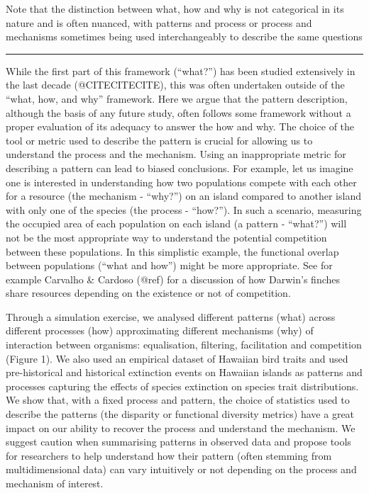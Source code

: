 \documentclass[12pt,letterpaper]{article}
\begin{document}
Note that the distinction between what, how and why is not categorical in its nature and is often nuanced, with patterns and process or process and mechanisms sometimes being used interchangeably to describe the same questions

\hrule

While the first part of this framework (“what?”) has been studied extensively in the last decade (@CITECITECITE), this was often undertaken outside of the “what, how, and why” framework.
Here we argue that the pattern description, although the basis of any future study, often follows some framework without a proper evaluation of its adequacy to answer the how and why.
The choice of the tool or metric used to describe the pattern is crucial for allowing us to understand the process and the mechanism.
Using an inappropriate metric for describing a pattern can lead to biased conclusions.
For example, let us imagine one is interested in understanding how two populations compete with each other for a resource (the mechanism - “why?”) on an island compared to another island with only one of the species (the process - “how?”).
In such a scenario, measuring the occupied area of each population on each island (a pattern - “what?”) will not be the most appropriate way to understand the potential competition between these populations.
In this simplistic example, the functional overlap between populations (“what and how”) might be more appropriate.
See for example Carvalho \& Cardoso (@ref) for a discussion of how Darwin’s finches share resources depending on the existence or not of competition.

Through a simulation exercise, we analysed different patterns (what) across different processes (how) approximating different mechanisms (why) of interaction between organisms: equalisation, filtering, facilitation and competition (Figure 1).
We also used an empirical dataset of Hawaiian bird traits and used pre-historical and historical extinction events on Hawaiian islands as patterns and processes capturing the effects of species extinction on species trait distributions.
We show that, with a fixed process and pattern, the choice of statistics used to describe the patterns (the disparity or functional diversity metrics) have a great impact on our ability to recover the process and understand the mechanism.
We suggest caution when summarising patterns in observed data and propose tools for researchers to help understand how their pattern (often stemming from multidimensional data) can vary intuitively or not depending on the process and mechanism of interest.
\end{document}
